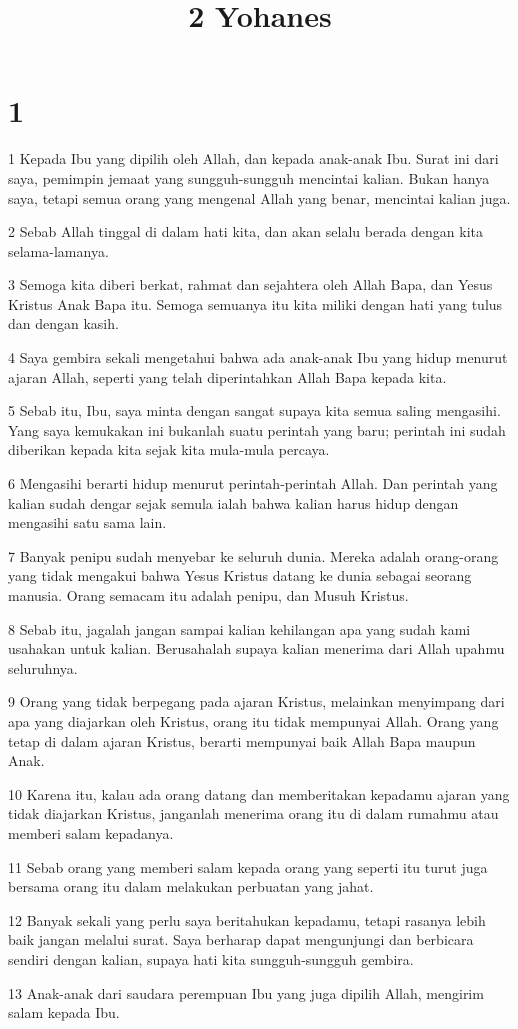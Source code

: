 

\title{2 Yohanes}


\chapter{1}

\par 1 Kepada Ibu yang dipilih oleh Allah, dan kepada anak-anak Ibu. Surat ini dari saya, pemimpin jemaat yang sungguh-sungguh mencintai kalian. Bukan hanya saya, tetapi semua orang yang mengenal Allah yang benar, mencintai kalian juga.
\par 2 Sebab Allah tinggal di dalam hati kita, dan akan selalu berada dengan kita selama-lamanya.
\par 3 Semoga kita diberi berkat, rahmat dan sejahtera oleh Allah Bapa, dan Yesus Kristus Anak Bapa itu. Semoga semuanya itu kita miliki dengan hati yang tulus dan dengan kasih.
\par 4 Saya gembira sekali mengetahui bahwa ada anak-anak Ibu yang hidup menurut ajaran Allah, seperti yang telah diperintahkan Allah Bapa kepada kita.
\par 5 Sebab itu, Ibu, saya minta dengan sangat supaya kita semua saling mengasihi. Yang saya kemukakan ini bukanlah suatu perintah yang baru; perintah ini sudah diberikan kepada kita sejak kita mula-mula percaya.
\par 6 Mengasihi berarti hidup menurut perintah-perintah Allah. Dan perintah yang kalian sudah dengar sejak semula ialah bahwa kalian harus hidup dengan mengasihi satu sama lain.
\par 7 Banyak penipu sudah menyebar ke seluruh dunia. Mereka adalah orang-orang yang tidak mengakui bahwa Yesus Kristus datang ke dunia sebagai seorang manusia. Orang semacam itu adalah penipu, dan Musuh Kristus.
\par 8 Sebab itu, jagalah jangan sampai kalian kehilangan apa yang sudah kami usahakan untuk kalian. Berusahalah supaya kalian menerima dari Allah upahmu seluruhnya.
\par 9 Orang yang tidak berpegang pada ajaran Kristus, melainkan menyimpang dari apa yang diajarkan oleh Kristus, orang itu tidak mempunyai Allah. Orang yang tetap di dalam ajaran Kristus, berarti mempunyai baik Allah Bapa maupun Anak.
\par 10 Karena itu, kalau ada orang datang dan memberitakan kepadamu ajaran yang tidak diajarkan Kristus, janganlah menerima orang itu di dalam rumahmu atau memberi salam kepadanya.
\par 11 Sebab orang yang memberi salam kepada orang yang seperti itu turut juga bersama orang itu dalam melakukan perbuatan yang jahat.
\par 12 Banyak sekali yang perlu saya beritahukan kepadamu, tetapi rasanya lebih baik jangan melalui surat. Saya berharap dapat mengunjungi dan berbicara sendiri dengan kalian, supaya hati kita sungguh-sungguh gembira.
\par 13 Anak-anak dari saudara perempuan Ibu yang juga dipilih Allah, mengirim salam kepada Ibu.


